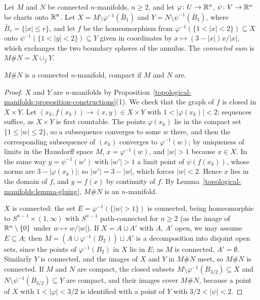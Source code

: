 \begin{definition}\label{topological-manifolds:definition-connected-sum}
Let $M$ and $N$ be connected $n$-manifolds, $n \geq 2$, and let $\varphi \colon U \to \mathbb{R}^n$, $\psi \colon V \to \mathbb{R}^n$ be charts onto $\mathbb{R}^n$. Let $X = M \setminus \varphi^{-1}(\bar B_1)$ and $Y = N \setminus \psi^{-1}(\bar B_1)$, where
$\bar B_r = \{|x| \leq r\}$, and let $f$ be the homeomorphism from $\varphi^{-1}(\{1 < |x| < 2\}) \subseteq X$ onto $\psi^{-1}(\{1 < |y| < 2\}) \subseteq Y$ given in coordinates by $x \mapsto (3 - |x|)x/|x|$, which exchanges the two
boundary spheres of the annulus. The \emph{connected sum} is $M \# N = X \cup_fY$.
\end{definition}

\begin{proposition}\label{topological-manifolds:proposition-connected-sum}
$M \# N$ is a connected $n$-manifold, compact if $M$ and $N$ are.
\end{proposition}

\begin{proof}
$X$ and $Y$ are $n$-manifolds by Proposition~\ref{topological-manifolds:proposition-constructions}(1). We check that the graph of $f$ is closed in $X \times Y$. Let $(x_k, f(x_k)) \to (x, y) \in X \times Y$ with
$1 < |\varphi(x_k)| < 2$; sequences suffice, as $X \times Y$ is first countable. The points $\varphi(x_k)$ lie in the compact set $\{1 \leq |w| \leq 2\}$, so a subsequence converges to some $w$ there, and then the corresponding
subsequence of $(x_k)$ converges to $\varphi^{-1}(w)$; by uniqueness of limits in the Hausdorff space $M$, $x = \varphi^{-1}(w)$, and $|w| > 1$ because $x \in X$. In the same way $y = \psi^{-1}(w')$ with $|w'| > 1$ a limit point of
$\psi(f(x_k))$, whose norms are $3 - |\varphi(x_k)|$; so $|w'| = 3 - |w|$, which forces $|w| < 2$. Hence $x$ lies in the domain of $f$, and $y = f(x)$ by continuity of $f$. By Lemma~\ref{topological-manifolds:lemma-gluing},
$M \# N$ is an $n$-manifold.

$X$ is connected: the set $E = \varphi^{-1}(\{|w| > 1\})$ is connected, being homeomorphic to $S^{n-1} \times (1, \infty)$ with $S^{n-1}$ path-connected for $n \geq 2$ (as the image of $\mathbb{R}^n \setminus \{0\}$ under $w \mapsto w/|w|$). If $X = A \sqcup A'$
with $A$, $A'$ open, we may assume $E \subseteq A$; then $M = (A \cup \varphi^{-1}(B_2)) \sqcup A'$ is a decomposition into disjoint open sets, since the points of $\varphi^{-1}(B_2)$ in $X$ lie in $E$; as $M$ is connected, $A' = \emptyset$.
Similarly $Y$ is connected, and the images of $X$ and $Y$ in $M \# N$ meet, so $M \# N$ is connected. If $M$ and $N$ are compact, the closed subsets $M \setminus \varphi^{-1}(B_{3/2}) \subseteq X$ and
$N \setminus \psi^{-1}(B_{3/2}) \subseteq Y$ are compact, and their images cover $M \# N$, because a point of $X$ with $1 < |\varphi| < 3/2$ is identified with a point of $Y$ with $3/2 < |\psi| < 2$.
\end{proof}

